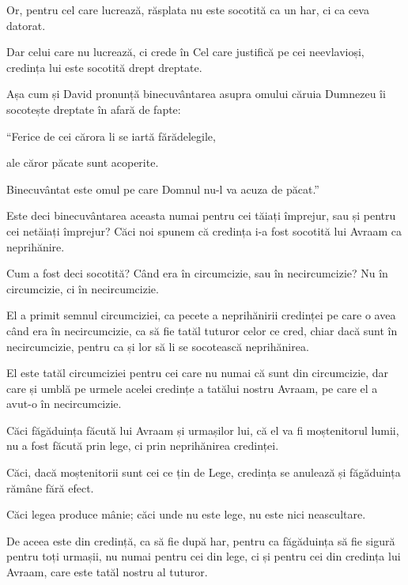 {Or, pentru cel care lucrează, răsplata nu este socotită ca un har, ci ca ceva datorat.

Dar celui care nu lucrează, ci crede în Cel care justifică pe cei neevlavioși, credința lui este socotită drept dreptate.

Așa cum și David pronunță binecuvântarea asupra omului căruia Dumnezeu îi socotește dreptate în afară de fapte:


\par }{\Q {}“Ferice de cei cărora li se iartă fărădelegile,

\par }{\QB ale căror păcate sunt acoperite.


\par }{\Q {}Binecuvântat este omul pe care Domnul nu-l va acuza de păcat.”


\par }{\PP {}Este deci binecuvântarea aceasta numai pentru cei tăiați împrejur, sau și pentru cei netăiați împrejur? Căci noi spunem că credința i-a fost socotită lui Avraam ca neprihănire.

Cum a fost deci socotită? Când era în circumcizie, sau în necircumcizie? Nu în circumcizie, ci în necircumcizie.

El a primit semnul circumciziei, ca pecete a neprihănirii credinței pe care o avea când era în necircumcizie, ca să fie tatăl tuturor celor ce cred, chiar dacă sunt în necircumcizie, pentru ca și lor să li se socotească neprihănirea.

El este tatăl circumciziei pentru cei care nu numai că sunt din circumcizie, dar care și umblă pe urmele acelei credințe a tatălui nostru Avraam, pe care el a avut-o în necircumcizie.


\par }{\PP {}Căci făgăduința făcută lui Avraam și urmașilor lui, că el va fi moștenitorul lumii, nu a fost făcută prin lege, ci prin neprihănirea credinței.

Căci, dacă moștenitorii sunt cei ce țin de Lege, credința se anulează și făgăduința rămâne fără efect.

Căci legea produce mânie; căci unde nu este lege, nu este nici neascultare.


\par }{\PP {}De aceea este din credință, ca să fie după har, pentru ca făgăduința să fie sigură pentru toți urmașii, nu numai pentru cei din lege, ci și pentru cei din credința lui Avraam, care este tatăl nostru al tuturor.

}
